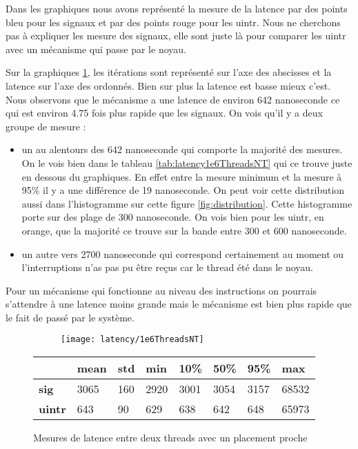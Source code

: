Dans les graphiques nous avons représenté la mesure de la latence par des points bleu pour les signaux et par des points rouge pour les uintr.
Nous ne cherchons pas à expliquer les mesure des signaux, elle sont juste là pour comparer les uintr avec un mécanisme qui passe par le noyau.

Sur la graphiques \ref{subfig:latency1e6ThreadsNT}, les itérations sont représenté sur l'axe des abscisses et la latence sur l'axe des ordonnés.
Bien sur plus la latence est basse mieux c'est.
Nous observons que le mécanisme a une latence de environ 642 nanoseconde ce qui est environ 4.75 fois plus rapide que les signaux.
On vois qu'il y a deux groupe de mesure :
\begin{itemize}
  \item un au alentours des 642 nanoseconde qui comporte la majorité des mesures.
  On le vois bien dans le tableau \ref{tab:latency1e6ThreadsNT} qui ce trouve juste en dessous du graphiques.
  En effet entre la mesure minimum et la mesure à 95\% il y a une différence de 19 nanoseconde.
  On peut voir cette distribution aussi dans l'histogramme sur cette figure \ref{fig:distribution}.
  Cette histogramme porte sur des plage de 300 nanoseconde.
  On vois bien pour les uintr, en orange, que la majorité ce trouve sur la bande entre 300 et 600 nanoseconde.
  \item un autre vers 2700 nanoseconde qui correspond certainement au moment ou l'interruptions n'as pas pu être reçus car le thread été dans le noyau.
\end{itemize}

Pour un mécanisme qui fonctionne au niveau des instructions on pourrais s'attendre à une latence moins grande mais le mécanisme est bien plus rapide que le fait de passé par le système.

\begin{figure}[H]
  \begin{subfigure}{\textwidth}
    \texttt{[image: latency/1e6ThreadsNT]}
    \caption{}
    \label{subfig:latency1e6ThreadsNT}
  \end{subfigure}
  \begin{subtable}{\textwidth}
    \centering
    \begin{tabular}{| l | l | l | l | l | l | l | l |}
      \hline
      &\bf mean &\bf std &\bf min  &\bf 10\% &\bf 50\% &\bf 95\% &\bf max\\
      \hline
      \bf sig   & 3065 & 160 & 2920 & 3001 & 3054 & 3157 & 68532\\
      \hline
      \bf uintr & 643  & 90  & 629  & 638  & 642  & 648  & 65973\\
      \hline
    \end{tabular}
    \caption{}
    \label{tab:latency1e6ThreadsNT}
  \end{subtable}
  \caption{Mesures de latence entre deux threads avec un placement proche}
  \label{fig:latency1e6ThreadsNT}
\end{figure}

